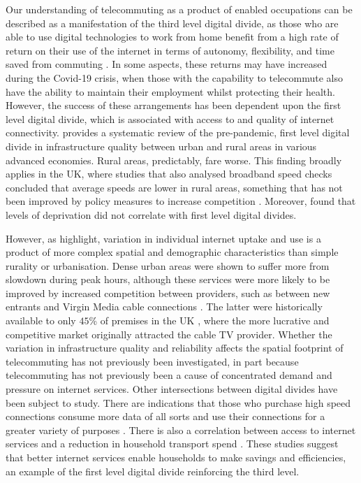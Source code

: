 \documentclass[]{interact}
\theoremstyle{plain}%
\theoremstyle{definition}
\theoremstyle{remark}
\begin{document}
Our understanding of telecommuting as a product of enabled occupations
can be described as a manifestation of the third level digital divide,
as those who are able to use digital technologies to work from home
benefit from a high rate of return on their use of the internet in terms
of autonomy, flexibility, and time saved from commuting
\citep{peters2004employees, siha2006telecommuting, singh2013modeling}.
In some aspects, these returns may have increased during the Covid-19
crisis, when those with the capability to telecommute also have the
ability to maintain their employment whilst protecting their health.
However, the success of these arrangements has been dependent upon the
first level digital divide, which is associated with access to and
quality of internet connectivity. \citet{SALEMINK2017360} provides a
systematic review of the pre-pandemic, first level digital divide in
infrastructure quality between urban and rural areas in various advanced
economies. Rural areas, predictably, fare worse. This finding broadly
applies in the UK, where studies that also analysed broadband speed
checks concluded that average speeds are lower in rural areas, something
that has not been improved by policy measures to increase competition
\citep{riddlesden2014broadband, nardotto2015unbundling}. Moreover,
\citet{riddlesden2014broadband} found that levels of deprivation did not
correlate with first level digital divides.

However, as \citet{blank2018local} highlight, variation in individual
internet uptake and use is a product of more complex spatial and
demographic characteristics than simple rurality or urbanisation. Dense
urban areas were shown to suffer more from slowdown during peak hours,
although these services were more likely to be improved by increased
competition between providers, such as between new entrants and Virgin
Media cable connections
\citep{riddlesden2014broadband, nardotto2015unbundling}. The latter were
historically available to only \(45\)\% of premises in the UK
\citep{ofcom2016}, where the more lucrative and competitive market
originally attracted the cable TV provider. Whether the variation in
infrastructure quality and reliability affects the spatial footprint of
telecommuting has not previously been investigated, in part because
telecommuting has not previously been a cause of concentrated demand and
pressure on internet services. Other intersections between digital
divides have been subject to study. There are indications that those who
purchase high speed connections consume more data of all sorts and use
their connections for a greater variety of purposes
\citep{hauge2011consumer}. There is also a correlation between access to
internet services and a reduction in household transport spend
\citep{bris2017ict}. These studies suggest that better internet services
enable households to make savings and efficiencies, an example of the
first level digital divide reinforcing the third level.
\end{document}
